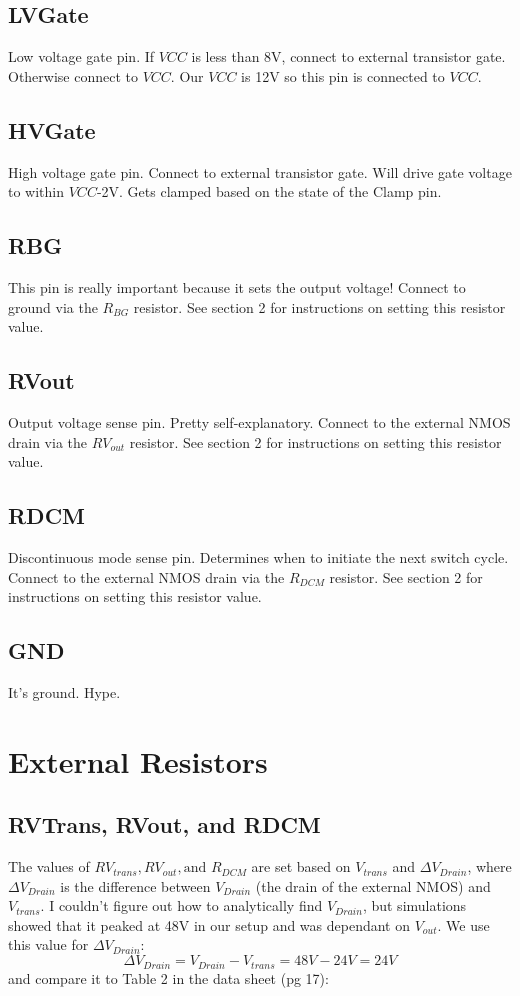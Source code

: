 \documentclass{article}
\begin{document}
	\subsection{LVGate}
	Low voltage gate pin. If $VCC$ is less than 8V, connect to external transistor gate. Otherwise connect to $VCC$. Our $VCC$ is 12V so this pin is connected to $VCC$. 
	
	\subsection{HVGate}
	High voltage gate pin. Connect to external transistor gate. Will drive gate voltage to within $VCC$-2V. Gets clamped based on the state of the Clamp pin.
	
	\subsection{RBG}
	This pin is really important because it sets the output voltage! Connect to ground via the $R_{BG}$ resistor. See section 2 for instructions on setting this resistor value.
	
	\subsection{RVout}
	Output voltage sense pin. Pretty self-explanatory. Connect to the external NMOS drain via the $RV_{out}$ resistor. See section 2 for instructions on setting this resistor value.
	
	\subsection{RDCM}
	Discontinuous mode sense pin. Determines when to initiate the next switch cycle. Connect to the external NMOS drain via the $R_{DCM}$ resistor. See section 2 for instructions on setting this resistor value.
	
	\subsection{GND}
	It's ground. Hype.
	
	\section{External Resistors}
	\subsection{RVTrans, RVout, and RDCM}
	The values of $RV_{trans}, RV_{out}, \text{and } R_{DCM}$ are set based on $V_{trans}$ and $\Delta V_{Drain}$, where $\Delta V_{Drain}$ is the difference between $V_{Drain}$ (the drain of the external NMOS) and $V_{trans}$. I couldn't figure out how to analytically find $V_{Drain}$, but simulations showed that it peaked at 48V in our setup and was dependant on $V_{out}$. We use this value for $\Delta V_{Drain}$:
	\[\Delta V_{Drain} = V_{Drain} - V_{trans} = 48V - 24V = 24V\]
	and compare it to Table 2 in the data sheet (pg 17):
	
\end{document}
